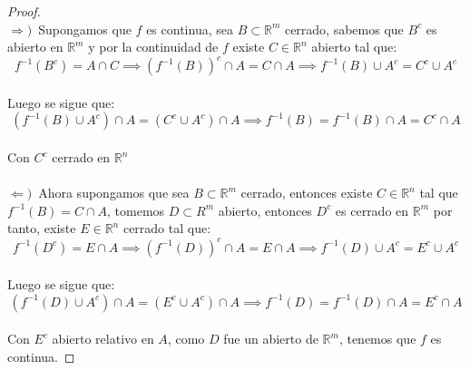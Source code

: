 \documentclass[11pt,letterpaper]{article}
\newcommand{\R}{\mathbb{R}}
\begin{document}
\begin{proof}\,\\
  $\Rightarrow)$\, Supongamos que $f$ es continua, sea $B\subset \R^m$ cerrado, sabemos que $B^c$ es abierto en $\R^m$ y por la continuidad de $f$ existe $C\in \R^n$ abierto tal que:
  \begin{equation*}
    f^{-1}(B^c)=A\cap C\implies (f^{-1}(B))^c\cap A=C\cap A\implies f^{-1}(B)\cup A^c=C^c\cup A^c
  \end{equation*}\,\\
  Luego se sigue que:\,\\
  \begin{equation*}
    (f^{-1}(B)\cup A^c)\cap A=(C^c\cup A^c)\cap A\implies f^{-1}(B)=f^{-1}(B)\cap A=C^c\cap A
  \end{equation*}\,\\
  Con $C^c$ cerrado en $\R^n$\,\\
  \,\\
  $\Leftarrow)$\, Ahora supongamos que sea $B\subset \R^m$ cerrado, entonces existe $C\in \R^n$ tal que $f^{-1}(B)=C\cap A$, tomemos $D\subset R^m$ abierto, entonces $D^c$ es cerrado en $\R^m$ por tanto, existe $E\in \R^n$ cerrado tal que:\,\\
  \begin{equation*}
    f^{-1}(D^c)=E\cap A\implies (f^{-1}(D))^c\cap A=E\cap A\implies f^{-1}(D)\cup A^c=E^c\cup A^c 
  \end{equation*}\,\\
  Luego se sigue que:\,\\
  \begin{equation*}
    (f^{-1}(D)\cup A^c)\cap A=(E^c\cup A^c)\cap A\implies f^{-1}(D)=f^{-1}(D)\cap A=E^c\cap A
  \end{equation*}\,\\
  Con $E^c$ abierto relativo en $A$, como $D$ fue un abierto de $\R^m$, tenemos que $f$ es continua.
\end{proof}
\end{document}
